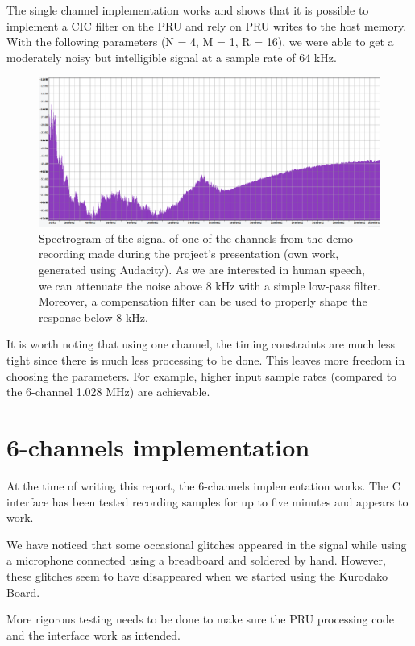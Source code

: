\documentclass[]{report}
\begin{document}
The single channel implementation works and shows that it is possible to implement a CIC filter on the PRU and rely on PRU writes to the host memory. With the following parameters (N = 4, M = 1, R = 16), we were able to get a moderately noisy but intelligible signal at a sample rate of 64 kHz.

\begin{figure}[H]
\centering
\includegraphics[width=0.8\linewidth]{Pictures/spectrogram.png}
\caption{Spectrogram of the signal of one of the channels from the demo recording made during the project's presentation (own work, generated using Audacity). As we are interested in human speech, we can attenuate the noise above 8 kHz with a simple low-pass filter. Moreover, a compensation filter can be used to properly shape the response below 8 kHz.}
\end{figure}

It is worth noting that using one channel, the timing constraints are much less tight since there is much less processing to be done. This leaves more freedom in choosing the parameters. For example, higher input sample rates (compared to the 6-channel 1.028 MHz) are achievable.

\hypertarget{channels-implementation}{%
\section{6-channels implementation}\label{channels-implementation}}

At the time of writing this report, the 6-channels implementation works. The C interface has been tested recording samples for up to five minutes and appears to work.

We have noticed that some occasional glitches appeared in the signal while using a microphone connected using a breadboard and soldered by hand. However, these glitches seem to have disappeared when we started using the Kurodako Board.

More rigorous testing needs to be done to make sure the PRU processing code and the interface work as intended.
\end{document}

